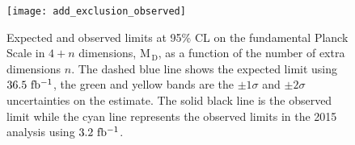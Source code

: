 \begin{figure}
  \centering
  \texttt{[image: add\_exclusion\_observed]}
  \caption{Expected and observed limits at 95\% CL on the fundamental Planck
    Scale in $4 + n$ dimensions, M$_\mathrm{\, D}$, as a function of the number
    of extra dimensions $n$. The dashed blue line shows the expected limit using
    $36.5~\mbox{fb$^{-1}$}$, the green and yellow bands are the $\pm 1 \sigma$ and
    $\pm 2 \sigma$ uncertainties on the estimate. The solid black line is the
    observed limit while the cyan line represents the observed limits in the
    2015 analysis using $3.2~\mbox{fb$^{-1}$}$.}
  \label{fig:add_observed}
\end{figure}
